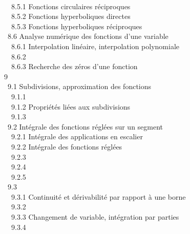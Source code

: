 \documentclass[]{article}
\begin{document}
 \\ ~~8.5.1
{Fonctions circulaires
réciproques} \\ ~~8.5.2 {Fonctions
hyperboliques directes} \\ ~~8.5.3
{Fonctions hyperboliques
réciproques} \\ ~8.6 {Analyse
numérique des fonctions d'une variable} \\ ~~8.6.1
{Interpolation linéaire,
interpolation polynomiale} \\ ~~8.6.2
 \\ ~~8.6.3
{Recherche des zéros d'une
fonction} \\ 9  \\ ~9.1
{Subdivisions, approximation des
fonctions} \\ ~~9.1.1
 \\
~~9.1.2 {Propriétés liées aux
subdivisions} \\ ~~9.1.3
 \\
~9.2 {Intégrale des fonctions
réglées sur un segment} \\ ~~9.2.1
{Intégrale des applications en
escalier} \\ ~~9.2.2 {Intégrale
des fonctions réglées} \\ ~~9.2.3
 \\ ~~9.2.4
 \\ ~~9.2.5
 \\ ~9.3
 \\
~~9.3.1 {Continuité et
dérivabilité par rapport à une borne} \\ ~~9.3.2
 \\ ~~9.3.3
{Changement de variable,
intégration par parties} \\ ~~9.3.4
\end{document}
